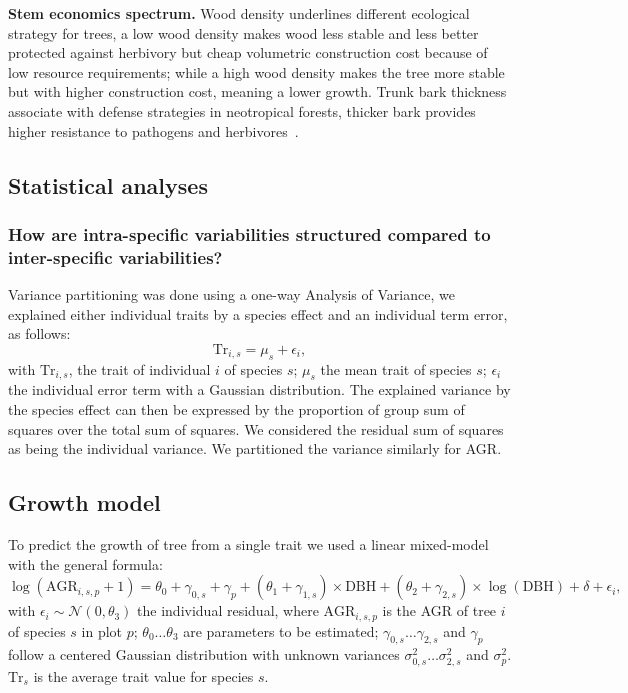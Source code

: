 \textbf{Stem economics spectrum.} Wood density underlines different ecological strategy for trees, a low wood density makes wood less stable and less better protected against herbivory but cheap volumetric construction cost because of low resource requirements; while a high wood density makes the tree more stable but with higher construction cost, meaning a lower growth. Trunk bark thickness associate with defense strategies in neotropical forests, thicker bark provides higher resistance to pathogens and herbivores~\citep{paine_functional_2010}.

\subsection*{Statistical analyses}

\subsubsection*{How are intra-specific variabilities structured compared to inter-specific variabilities?}
Variance partitioning was done using a one-way Analysis of Variance, we explained either individual traits by a species effect and an individual term error, as follows:
\begin{equation}
	\label{eq:anova}
	\text{Tr}_{i,s} = \mu_s + \epsilon_i,
\end{equation}
with $\text{Tr}_{i,s}$, the trait of individual $i$ of species $s$; $\mu_s$ the mean trait of species $s$; $\epsilon_i$ the individual error term with a Gaussian distribution. The explained variance by the species effect can then be expressed by the proportion of group sum of squares over the total sum of squares. We considered the residual sum of squares as being the individual variance. We partitioned the variance similarly for AGR.

\subsection*{Growth model}

To predict the growth of tree from a single trait we used a linear mixed-model with the general formula:
\begin{equation}
	\label{eq:growth_mod}
	\log(\text{AGR}_{i, s, p} + 1) = \theta_0 + \gamma_{0, s} + \gamma_p
		+ (\theta_1 + \gamma_{1, s}) \times \text{DBH}
		+ (\theta_2 + \gamma_{2, s}) \times \log(\text{DBH})
		+ \delta
		+ \epsilon_i,
\end{equation}
with $\epsilon_i \sim \mathcal{N}(0, \theta_3)$ the individual residual,
where $\text{AGR}_{i, s, p}$ is the AGR of tree $i$ of species $s$ in plot $p$; $\theta_0 \ldots \theta_3$ are parameters to be estimated; $\gamma_{0, s} \ldots \gamma_{2, s}$ and $\gamma_p$ follow a centered Gaussian distribution with unknown variances $\sigma^2_{0, s} \ldots \sigma^2_{2, s}$ and $\sigma^2_p$. $\text{Tr}_s$ is the average trait value for species $s$.

